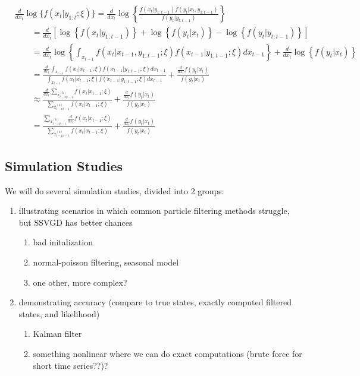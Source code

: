 \documentclass[]{article}
\providecommand{\tightlist}{%
  \setlength{\itemsep}{0pt}\setlength{\parskip}{0pt}}
\begin{document}
\begin{align*}
&\frac{d}{d x_t} \log\{f(x_{t} \vert y_{1:t}; \xi)\} = \frac{d}{d x_t} \log\left\{\frac{f(x_t \vert y_{1:t-1}) f(y_t \vert x_t, y_{1:t-1})}{f(y_t \vert y_{t:t-1})}\right\} \\
&\qquad = \frac{d}{d x_t} \left[ \log\left\{f(x_t \vert y_{1:t-1})\right\} + \log \left\{f(y_t \vert x_t)\right\} - \log\left\{f(y_t \vert y_{t:t-1})\right\} \right] \\
&\qquad = \frac{d}{d x_t} \log\left\{\int_{x_{t-1}}f(x_{t} \vert x_{t-1}, y_{1:t-1}; \xi)f(x_{t-1} \vert y_{1:t-1}; \xi) d x_{t-1} \right\} + \frac{d}{d x_t} \log \left\{ f(y_t \vert x_t) \right\} \\
&\qquad = \frac{\frac{d}{d x_t} \int_{x_{t-1}}f(x_{t} \vert x_{t-1}; \xi)f(x_{t-1} \vert y_{1:t-1}; \xi) d x_{t-1}}{\int_{x_{t-1}}f(x_{t} \vert x_{t-1}; \xi)f(x_{t-1} \vert y_{1:t-1}; \xi) d x_{t-1}} + \frac{\frac{d}{d x_t} f(y_t \vert x_t)}{f(y_t \vert x_t)} \\
&\qquad \approx \frac{\frac{d}{d x_t} \sum_{x_{t-1|t-1}^{(k)}}f(x_{t} \vert x_{t-1}; \xi)}{\sum_{x_{t-1|t-1}^{(k)}}f(x_{t} \vert x_{t-1}; \xi)} + \frac{\frac{d}{d x_t} f(y_t \vert x_t)}{f(y_t \vert x_t)} \\
&\qquad = \frac{\sum_{x_{t-1|t-1}^{(k)}} \frac{d}{d x_t} f(x_{t} \vert x_{t-1}; \xi)}{\sum_{x_{t-1|t-1}^{(k)}}f(x_{t} \vert x_{t-1}; \xi)} + \frac{\frac{d}{d x_t} f(y_t \vert x_t)}{f(y_t \vert x_t)}
\end{align*}

\subsection{Simulation Studies}\label{simulation-studies}

We will do several simulation studies, divided into 2 groups:

\begin{enumerate}
\def\labelenumi{\arabic{enumi}.}
\tightlist
\item
  illustrating scenarios in which common particle filtering methods
  struggle, but SSVGD has better chances

  \begin{enumerate}
  \def\labelenumii{\alph{enumii}.}
  \tightlist
  \item
    bad initalization
  \item
    normal-poisson filtering, seasonal model
  \item
    one other, more complex?
  \end{enumerate}
\item
  demonstrating accuracy (compare to true states, exactly computed
  filtered states, and likelihood)

  \begin{enumerate}
  \def\labelenumii{\alph{enumii}.}
  \tightlist
  \item
    Kalman filter
  \item
    something nonlinear where we can do exact computations (brute force
    for short time series??)?
  \end{enumerate}
\end{enumerate}
\end{document}
